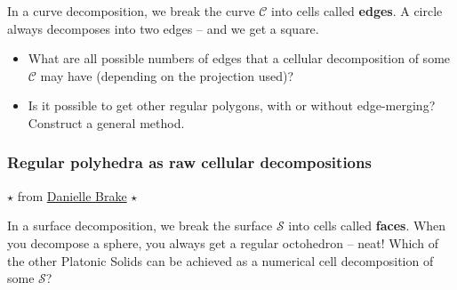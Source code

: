 \documentclass[letter,portrait]{article}
\newcommand{\1}{{\tt \_1}}
\newcommand{\2}{{\tt \_2}}
\begin{document}
In a curve decomposition, we break the curve $\mathcal{C}$ into cells called {\bf edges}.  A circle always decomposes into two edges -- and we get a square.  
\begin{itemize}
\item What are all possible numbers of edges that a cellular decomposition of some $\mathcal{C}$ may have (depending on the projection used)? 
\item Is it possible to get other regular polygons, with or without edge-merging?  Construct a general method.
\end{itemize}




\subsubsection{Regular polyhedra as raw cellular decompositions}


$\star$ from \href{https://danielleamethyst.org}{Danielle Brake} $\star$

In a surface decomposition, we break the surface $\mathcal{S}$ into cells called {\bf faces}.  When you decompose a sphere, you always get a regular octohedron -- neat!  Which of the other Platonic Solids can be achieved as a numerical cell decomposition of some $\mathcal{S}$?  














\end{document}
